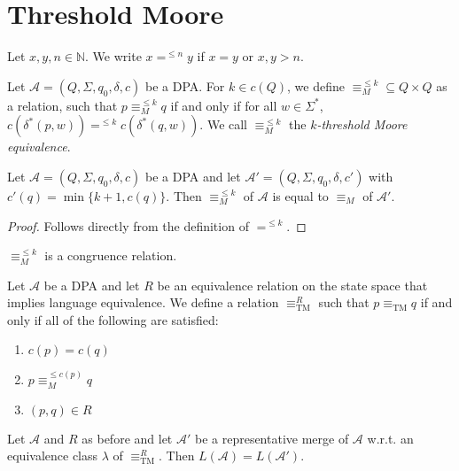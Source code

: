 \section{Threshold Moore}
\begin{defn}
	Let $x, y, n \in \mathbb{N}$. We write $x =^{\leq n} y$ if $x = y$ or $x, y > n$.

	Let $\mathcal{A} = (Q, \Sigma, q_0, \delta, c)$ be a DPA. For $k \in c(Q)$, we define $\equiv_M^{\leq k} \subseteq Q \times Q$ as a relation, such that $p \equiv_M^{\leq k} q$ if and only if for all $w \in \Sigma^*$, $c(\delta^*(p, w)) =^{\leq k} c(\delta^*(q, w))$. We call $\equiv_M^{\leq k}$ the \emph{$k$-threshold Moore equivalence}.
\end{defn}

\begin{lem}
	Let $\mathcal{A} = (Q, \Sigma, q_0, \delta, c)$ be a DPA and let $\mathcal{A}' = (Q, \Sigma, q_0, \delta, c')$ with $c'(q) = \min \{k+1, c(q)\}$. Then $\equiv_M^{\leq k}$ of $\mathcal{A}$ is equal to $\equiv_M$ of $\mathcal{A}'$.
	\label{lem:tremoore:mleq_is_actually_just_moore}
\end{lem}

\begin{proof}
	Follows directly from the definition of $=^{\leq k}$.
\end{proof}

\begin{cor}
	$\equiv_M^{\leq k}$ is a congruence relation.
\end{cor}

\begin{defn}
	Let $\mathcal{A}$ be a DPA and let $R$ be an equivalence relation on the state space that implies language equivalence. We define a relation $\equiv_\text{TM}^R$ such that $p \equiv_\text{TM} q$ if and only if all of the following are satisfied:
	\begin{enumerate}
		\item $c(p) = c(q)$
		\item $p \equiv_M^{\leq c(p)} q$
		\item $(p, q) \in R$
	\end{enumerate}
\end{defn}


\begin{theorem}
	Let $\mathcal{A}$ and $R$ as before and let $\mathcal{A}'$ be a representative merge of $\mathcal{A}$ w.r.t. an equivalence class $\lambda$ of $\equiv_\text{TM}^R$. Then $L(\mathcal{A}) = L(\mathcal{A}')$.
\end{theorem}

